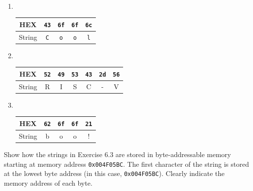 \documentclass[12pt]{article}
\newenvironment{ex}[2][Exercise]{\begin{trivlist}
		\item[\hskip \labelsep {\bfseries #1}\hskip \labelsep {\bfseries #2.}]}{\end{trivlist}}
\newenvironment{sol}[1][Solution]{\begin{trivlist}
		\item[\hskip \labelsep {\bfseries #1:}]}{\end{trivlist}}
\begin{document}
\begin{sol}
	\
	\begin{enumerate}[label=(\alph*)]
		\item 
		\
		\begin{center}
			\begin{tabular}{c|cccc}
				HEX & \texttt{43} & \texttt{6f} & \texttt{6f} & \texttt{6c}\\
				\hline
				String & \texttt{C} & \texttt{o} & \texttt{o} & \texttt{l}
			\end{tabular}
		\end{center}
		\item 
		\
		\begin{center}
			\begin{tabular}{c|cccccc}
				HEX & \texttt{52} & \texttt{49} & \texttt{53} & \texttt{43} & \texttt{2d} & \texttt{56}\\
				\hline
				String & R & I & S & C & - & V
			\end{tabular}
		\end{center}
		\item 
		\
		\begin{center}
			\begin{tabular}{c|cccc}
				HEX & \texttt{62} & \texttt{6f} & \texttt{6f} & \texttt{21}\\
				\hline
				String & b & o & o & !
			\end{tabular}
		\end{center}
	\end{enumerate}
\end{sol}

\begin{ex}{6.5}
	Show how the strings in Exercise 6.3 are stored in byte-addressable memory starting at memory address
	\texttt{0x004F05BC}. The first character of the string is stored at the lowest byte address (in this
	case, \texttt{0x004F05BC}). Clearly indicate the memory address of each byte.
\end{ex}
\end{document}
